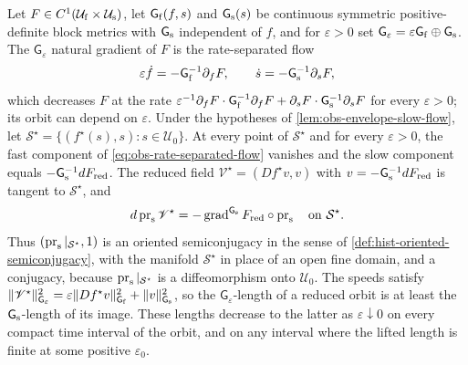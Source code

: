 Let $F\in C^1(\mathcal U_{\rm f}\times\mathcal U_{\rm s})$, let
$\mathsf G_{\rm f}(f,s)$ and $\mathsf G_{\rm s}(s)$ be continuous symmetric
positive-definite block metrics with $\mathsf G_{\rm s}$ independent of $f$, and
for $\varepsilon>0$ set
$\mathsf G_\varepsilon=\varepsilon\mathsf G_{\rm f}\oplus\mathsf G_{\rm s}$. The
$\mathsf G_\varepsilon$ natural gradient of $F$ is the rate-separated flow
\begin{equation}
\varepsilon\dot f=-\mathsf G_{\rm f}^{-1}\partial_fF,
\qquad
\dot s=-\mathsf G_{\rm s}^{-1}\partial_sF,
\label{eq:obs-rate-separated-flow}
\end{equation}
which decreases $F$ at the rate
$\varepsilon^{-1}\partial_fF\cdot\mathsf G_{\rm f}^{-1}\partial_fF
+\partial_sF\cdot\mathsf G_{\rm s}^{-1}\partial_sF$ for every $\varepsilon>0$; its
orbit can depend on $\varepsilon$. Under the hypotheses of
\cref{lem:obs-envelope-slow-flow}, let
$\mathcal S^\star=\{(f^\star(s),s):s\in\mathcal U_0\}$. At every point of
$\mathcal S^\star$ and for every $\varepsilon>0$, the fast component of
\eqref{eq:obs-rate-separated-flow} vanishes and the slow component equals
$-\mathsf G_{\rm s}^{-1}dF_{\rm red}$. The reduced field
$\mathscr V^\star=(Df^\star v,v)$ with $v=-\mathsf G_{\rm s}^{-1}dF_{\rm red}$ is
tangent to $\mathcal S^\star$, and
\begin{equation}
d\operatorname{pr}_{\rm s}\mathscr V^\star
=-\operatorname{grad}^{\mathsf G_{\rm s}}F_{\rm red}\circ\operatorname{pr}_{\rm s}
\quad\text{on }\mathcal S^\star.
\label{eq:obs-reduced-semiconjugacy}
\end{equation}
Thus $(\operatorname{pr}_{\rm s}|_{\mathcal S^\star},1)$ is an oriented
semiconjugacy in the sense of \cref{def:hist-oriented-semiconjugacy}, with the
manifold $\mathcal S^\star$ in place of an open fine domain, and a conjugacy,
because $\operatorname{pr}_{\rm s}|_{\mathcal S^\star}$ is a diffeomorphism onto
$\mathcal U_0$. The speeds satisfy
$\lVert\mathscr V^\star\rVert^2_{\mathsf G_\varepsilon}
=\varepsilon\lVert Df^\star v\rVert^2_{\mathsf G_{\rm f}}+\lVert v\rVert^2_{\mathsf G_{\rm s}}$,
so the $\mathsf G_\varepsilon$-length of a reduced orbit is at least the
$\mathsf G_{\rm s}$-length of its image. These lengths decrease to the latter as
$\varepsilon\downarrow0$ on every compact time interval of the orbit, and on
any interval where the lifted length is finite at some positive
$\varepsilon_0$. 

